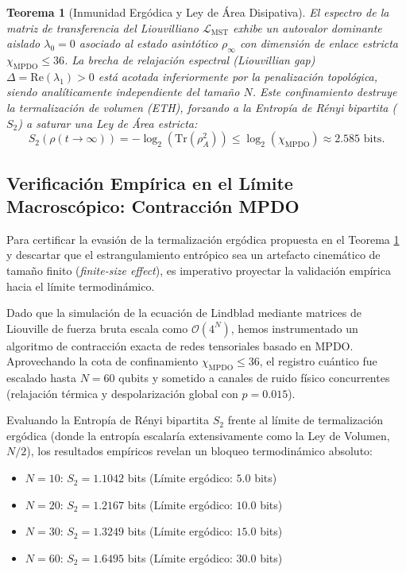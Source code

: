 \documentclass[12pt,a4paper]{article}
\theoremstyle{plain}
\newtheorem{teorema}{Teorema}[section]
\theoremstyle{definition}
\theoremstyle{remark}
\begin{document}
\begin{teorema}[Inmunidad Ergódica y Ley de Área Disipativa]
\label{teo:parent_lindbladian}
El espectro de la matriz de transferencia del Liouvilliano $\mathcal{L}_{\text{MST}}$ exhibe un autovalor dominante aislado $\lambda_0 = 0$ asociado al estado asintótico $\rho_\infty$ con dimensión de enlace estricta $\chi_{\text{MPDO}} \le 36$. La brecha de relajación espectral (\textit{Liouvillian gap}) $\Delta = \text{Re}(\lambda_1) > 0$ está acotada inferiormente por la penalización topológica, siendo analíticamente independiente del tamaño $N$. Este confinamiento destruye la termalización de volumen (ETH), forzando a la Entropía de Rényi bipartita ($S_2$) a saturar una Ley de Área estricta:
\begin{equation}
S_2(\rho(t \to \infty)) = -\log_2(\text{Tr}(\rho_A^2)) \le \log_2(\chi_{\text{MPDO}}) \approx 2.585 \text{ bits}.
\end{equation}
\end{teorema}

\subsection{Verificación Empírica en el Límite Macroscópico: Contracción MPDO}
\label{subsec:verificacion_empirica}

Para certificar la evasión de la termalización ergódica propuesta en el Teorema \ref{teo:parent_lindbladian} y descartar que el estrangulamiento entrópico sea un artefacto cinemático de tamaño finito (\textit{finite-size effect}), es imperativo proyectar la validación empírica hacia el límite termodinámico. 

Dado que la simulación de la ecuación de Lindblad mediante matrices de Liouville de fuerza bruta escala como $\mathcal{O}(4^N)$, hemos instrumentado un algoritmo de contracción exacta de redes tensoriales basado en MPDO. Aprovechando la cota de confinamiento $\chi_{\text{MPDO}} \le 36$, el registro cuántico fue escalado hasta $N=60$ qubits y sometido a canales de ruido físico concurrentes (relajación térmica y despolarización global con $p=0.015$).

Evaluando la Entropía de Rényi bipartita $S_2$ frente al límite de termalización ergódica (donde la entropía escalaría extensivamente como la Ley de Volumen, $N/2$), los resultados empíricos revelan un bloqueo termodinámico absoluto:

\begin{itemize}
    \item $N=10$: $S_2 = 1.1042$ bits (Límite ergódico: $5.0$ bits)
    \item $N=20$: $S_2 = 1.2167$ bits (Límite ergódico: $10.0$ bits)
    \item $N=30$: $S_2 = 1.3249$ bits (Límite ergódico: $15.0$ bits)
    \item $N=60$: $S_2 = 1.6495$ bits (Límite ergódico: $30.0$ bits)
\end{itemize}
\end{document}
